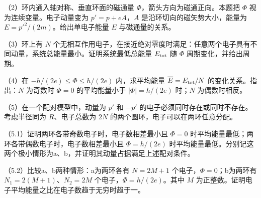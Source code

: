 \documentclass[12pt,a4paper,fontset=fandol]{ctexart}
\begin{document}
（2）环内通入轴对称、垂直环面的磁通量
\(\Phi\)，箭头方向为磁通正向。本题把 \(\Phi\) 视为连续变量。电子动量变为
\(p'=p+eA\)，\(A\) 是沿环切向的磁矢势大小，能量为
\(E=p'^2/(2m)\)。给出单电子能量 \(E\) 与磁通量的关系。

（3）环上有 \(N\)
个无相互作用电子，在接近绝对零度时满足：任意两个电子具有不同动量，系统总能量最小。证明系统最低总能量
\(E_{\rm tot}\) 随 \(\Phi\) 周期变化，并给出周期。

（4）在 \(-h/(2e)\le\Phi\le h/(2e)\) 内，求平均能量
\(\overline E=E_{\rm tot}/N\) 的变化关系。指出：\(N\) 为奇数时
\(\Phi=0\) 的平均能量小于 \(|\Phi|=h/(2e)\) 时；\(N\) 为偶数时相反。

（5）在一个配对模型中，动量为 \(p'\) 和 \(-p'\)
的电子必须同时存在或同时不存在。考虑半径同为 \(R\)、电子总数为 \(2N\)
的两个圆环，电子可以在两环任意分配。

（5.1）证明两环各带奇数电子时，电子数相差最小且 \(\Phi=0\)
时平均能量最低；两环各带偶数电子时，电子数相差最小且 \(\Phi=h/(2e)\)
时平均能量最低。分别记这两个极小情形为a、b，并证明其动量占据满足上述配对条件。

（5.2）比较a、b两种情形：a为两环各有 \(N=2M+1\)
个电子，\(\Phi=0\)；b为两环有 \(N_1=2(M+1)\)、\(N_2=2M\)
个电子，\(\Phi=h/(2e)\)。其中 \(M\)
为正整数。证明电子平均能量之比在电子数趋于无穷时趋于一。
\end{document}
